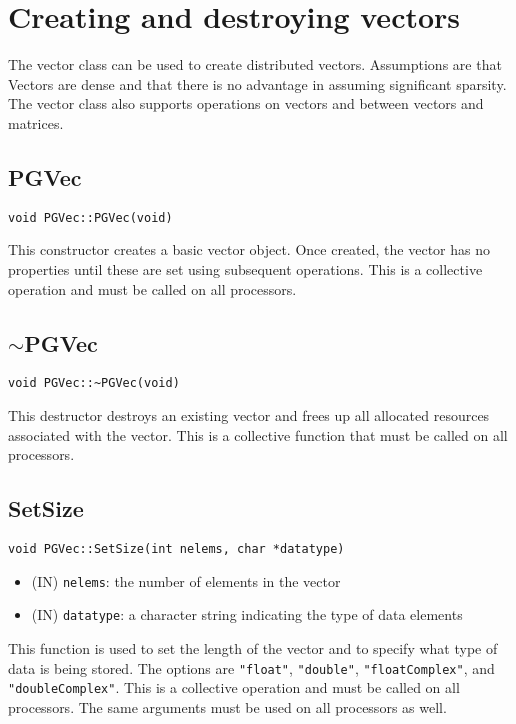 \documentclass[12pt]{article}
\begin{document}
\section{Creating and destroying vectors}
The vector class can be used to create distributed vectors. Assumptions are that
Vectors are dense and that there is no advantage in assuming significant
sparsity. The vector class also supports operations on vectors and between
vectors and matrices.
\subsection{PGVec}
\begin{verbatim}
void PGVec::PGVec(void)
\end{verbatim}
This constructor creates a basic vector object. Once created, the vector has no
properties until these are set using subsequent operations. This is a collective
operation and must be called on all processors.
\subsection{$\sim$PGVec}
\begin{verbatim}
void PGVec::~PGVec(void)
\end{verbatim}
This destructor destroys an existing vector and frees up all allocated resources
associated with the vector. This is a collective function that must be called on
all processors.
\subsection{SetSize}
\begin{verbatim}
void PGVec::SetSize(int nelems, char *datatype)
\end{verbatim}
\begin{itemize}
\item (IN) \texttt{nelems}: the number of elements in the vector
\item (IN) \texttt{datatype}: a character string indicating the type of data
elements
\end{itemize}
This function is used to set the length of the vector and to specify what
type of data is being stored. The options are \texttt{"float"},
\texttt{"double"}, \texttt{"floatComplex"}, and \texttt{"doubleComplex"}. This
is a collective operation and must be called on all processors. The same
arguments must be used on all processors as well.
\end{document}

